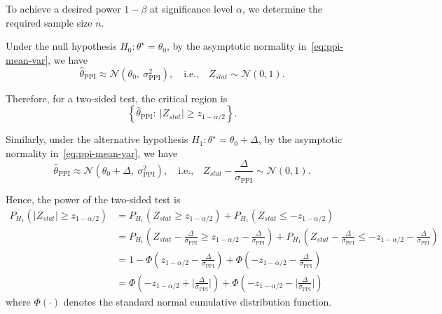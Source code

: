 \noindent
To achieve a desired power $1-\beta$ at significance level $\alpha$, we determine the required sample size $n$.


\noindent
Under the null hypothesis $ H_0\!:\theta^\star = \theta_0 $, by the asymptotic normality in~\eqref{eq:ppi-mean-var}, we have
\[
\widehat{\theta}_{\mathrm{PPI}} 
\approx 
\mathcal{N}\!\left(
  \theta_0,\ 
  \sigma_{\mathrm{PPI}}^2
\right),
\quad \text{i.e.,} \quad 
Z_{stat} \sim \mathcal{N}(0,1).
\]


\noindent
Therefore, for a two-sided test, the critical region is
\[
\left\{
\widehat{\theta}_{\mathrm{PPI}}:\ 
|Z_{stat}| \ge z_{1-\alpha/2}
\right\}.
\]

\noindent
Similarly, under the alternative hypothesis $ H_1\!:\theta^\star = \theta_0 + \Delta $, by the asymptotic normality in~\eqref{eq:ppi-mean-var}, we have
\[
\widehat{\theta}_{\mathrm{PPI}} 
\approx 
\mathcal{N}\!\left(
  \theta_0 + \Delta,\ 
  \sigma_{\mathrm{PPI}}^2
\right),
\quad \text{i.e.,} \quad 
Z_{stat} -
  \frac{\Delta}{\sigma_{\mathrm{PPI}}}
\sim 
\mathcal{N}(0,1).
\]


\noindent
Hence, the power of the two-sided test is
\begin{align*}
    P_{H_1}\!\left(|Z_{stat}| \ge z_{1-\alpha/2}\right)&=
    P_{H_1}\!\left(Z_{stat} \ge z_{1-\alpha/2}\right) +
    P_{H_1}\!\left(Z_{stat} \le -z_{1-\alpha/2}\right)\\
    &=P_{H_1}\!\left(Z_{stat}-\frac{\Delta}{\sigma_{\mathrm{PPI}}} \ge z_{1-\alpha/2}-\frac{\Delta}{\sigma_{\mathrm{PPI}}}\right) +
    P_{H_1}\!\left(Z_{stat}-\frac{\Delta}{\sigma_{\mathrm{PPI}}} \le -z_{1-\alpha/2}-\frac{\Delta}{\sigma_{\mathrm{PPI}}}\right)\\
    &=1-\Phi\left(z_{1-\alpha/2}-\frac{\Delta}{\sigma_{\mathrm{PPI}}}\right)+\Phi\left(-z_{1-\alpha/2}-\frac{\Delta}{\sigma_{\mathrm{PPI}}}\right)\\
    &=\Phi\left(-z_{1-\alpha/2}+\Bigg|\frac{\Delta}{\sigma_{\mathrm{PPI}}}\Bigg|\right)+\Phi\left(-z_{1-\alpha/2}-\Bigg|\frac{\Delta}{\sigma_{\mathrm{PPI}}}\Bigg|\right)
\end{align*} where $\Phi(\cdot)$ denotes the standard normal cumulative distribution function.


